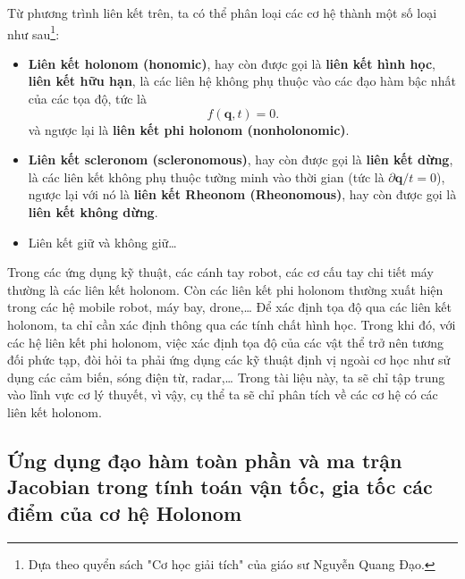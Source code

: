 Từ phương trình liên kết trên, ta có thể phân loại các cơ hệ thành một số loại như sau\footnote{Dựa theo quyển sách "Cơ học giải tích" của giáo sư Nguyễn Quang Đạo.}:
\begin{itemize}
    \item \textbf{Liên kết holonom (honomic)}, hay còn được gọi là \textbf{liên kết hình học}, \textbf{liên kết hữu hạn}, là các liên hệ không phụ thuộc vào các đạo hàm bậc nhất của các tọa độ, tức là
    \begin{equation*}
        f(\mathbf{q}, t) = 0.
    \end{equation*}
    và ngược lại là \textbf{ liên kết phi holonom (nonholonomic)}.
    \item \textbf{Liên kết scleronom (scleronomous)}, hay còn được gọi là \textbf{liên kết dừng}, là các liên kết không phụ thuộc tường minh vào thời gian (tức là $\partial \mathbf{q} / t = 0$), ngược lại với nó là \textbf{liên kết Rheonom (Rheonomous)}, hay còn được gọi là \textbf{liên kết không dừng}.
    \item Liên kết giữ và không giữ\ldots %
\end{itemize}
Trong các ứng dụng kỹ thuật, các cánh tay robot, các cơ cấu tay chi tiết máy thường là các liên kết holonom. 
Còn các liên kết phi holonom thường xuất hiện trong các hệ mobile robot, máy bay, drone,\ldots 
Để xác định tọa độ qua các liên kết holonom, ta chỉ cần xác định thông qua các tính chất hình học. 
Trong khi đó, với các hệ liên kết phi holonom, việc xác định tọa độ của các vật thể trở nên tương đối phức tạp, đòi hỏi ta phải ứng dụng các kỹ thuật định vị ngoài cơ học như sử dụng các cảm biến, sóng điện từ, radar,\ldots 
Trong tài liệu này, ta sẽ chỉ tập trung vào lĩnh vực cơ lý thuyết, vì vậy, cụ thể ta sẽ chỉ phân tích về các cơ hệ có các liên kết holonom.

\subsection{Ứng dụng đạo hàm toàn phần và ma trận Jacobian trong tính toán vận tốc, gia tốc các điểm của cơ hệ Holonom}

